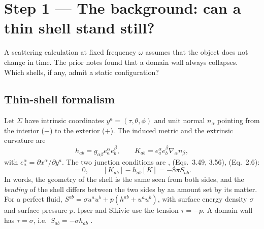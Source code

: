 \documentclass[11pt,a4paper]{article}
\numberwithin{equation}{section}
\begin{document}
\section{Step 1 --- The background: can a thin shell stand still?}\label{sec:bg}
\begin{question}
A scattering calculation at fixed frequency $\omega$ assumes that the object does not change in time. The prior notes
found that a domain wall always collapses. Which shells, if any, admit a static configuration?
\end{question}

\subsection{Thin-shell formalism}
Let $\Sigma$ have intrinsic coordinates $y^a=(\tau,\theta,\phi)$ and unit normal $n_\alpha$ pointing from the interior
($-$) to the exterior ($+$). The induced metric and the extrinsic curvature are \cite{Poisson04}
\begin{equation}
h_{ab}=g_{\alpha\beta}e^\alpha_ae^\beta_b,\qquad K_{ab}=e^\alpha_ae^\beta_b\nabla_\alpha n_\beta ,
\end{equation}
with $e^\alpha_a=\partial x^\alpha/\partial y^a$. The two junction conditions are \cite{Israel66}, \cite{Poisson04}
(Eqs.~3.49, 3.56), \cite{IS84} (Eq.~2.6):
\begin{equation}
[h_{ab}]=0,\qquad [K_{ab}]-h_{ab}[K]=-8\pi S_{ab}.
\label{eq:israel}
\end{equation}
In words, the geometry of the shell is the same seen from both sides, and the \emph{bending} of the shell differs
between the two sides by an amount set by its matter. For a perfect fluid,
$S^{ab}=\sigma u^au^b+p(h^{ab}+u^au^b)$, with surface energy density $\sigma$ and surface pressure $p$. Ipser and
Sikivie use the tension $\tau=-p$. A domain wall has $\tau=\sigma$, i.e.\ $S_{ab}=-\sigma h_{ab}$ \cite{IS84}.
\end{document}
